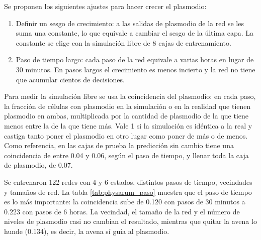 Se proponen los siguientes ajustes para hacer crecer el plasmodio:
\begin{enumerate}
	\item Definir un sesgo de crecimiento: a las salidas de plasmodio de la red se les suma una constante, lo que equivale a cambiar el sesgo de la última capa. La constante se elige con la simulación libre de 8 cajas de entrenamiento.

	\item Paso de tiempo largo: cada paso de la red equivale a varias horas en lugar de 30 minutos. En pasos largos el crecimiento es menos incierto y la red no tiene que acumular cientos de decisiones.
\end{enumerate}

Para medir la simulación libre se usa la coincidencia del plasmodio: en cada paso, la fracción de células con plasmodio en la simulación o en la realidad que tienen plasmodio en ambas, multiplicada por la cantidad de plasmodio de la que tiene menos entre la de la que tiene más. Vale 1 si la simulación es idéntica a la real y castiga tanto poner el plasmodio en otro lugar como poner de más o de menos. Como referencia, en las cajas de prueba la predicción sin cambio tiene una coincidencia de entre 0.04 y 0.06, según el paso de tiempo, y llenar toda la caja de plasmodio, de 0.07.


Se entrenaron 122 redes con 4 y 6 estados, distintos pasos de tiempo, vecindades y tamaños de red. La tabla \ref{tab:physarum_paso} muestra que el paso de tiempo es lo más importante: la coincidencia sube de 0.120 con pasos de 30 minutos a 0.223 con pasos de 6 horas. La vecindad, el tamaño de la red y el número de niveles de plasmodio casi no cambian el resultado, mientras que quitar la avena lo hunde (0.134), es decir, la avena sí guía al plasmodio.

